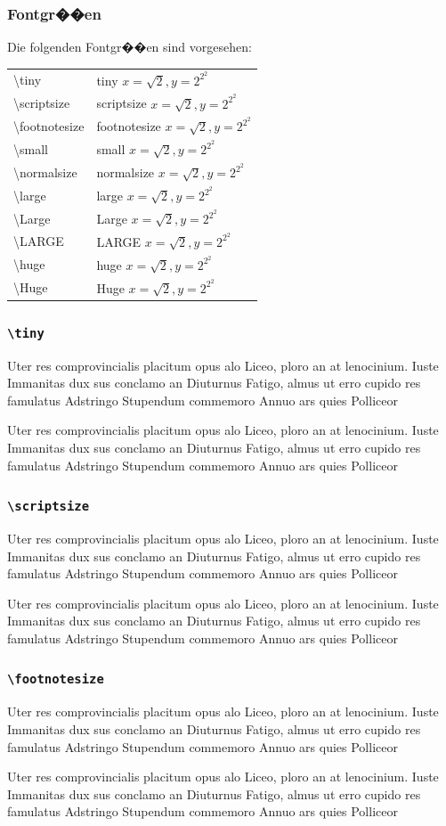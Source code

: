 \documentclass[t]{beamer}
\newcommand{\parxmpl}{
  Uter res comprovincialis placitum opus alo Liceo, ploro an at lenocinium.
  Iuste Immanitas dux sus conclamo an Diuturnus
  Fatigo, almus ut erro cupido res famulatus Adstringo
  Stupendum commemoro Annuo ars quies Polliceor
}
\begin{document}
\begin{frame}
  \frametitle{Fontgr��en}

  Die folgenden Fontgr��en sind vorgesehen:

  \begin{tabular}{>{\ttfamily}ll}
  \textbackslash tiny & \tiny tiny \quad \(x=\sqrt{2}, y=2^{2^2}\) \\
  \textbackslash scriptsize & \scriptsize scriptsize \quad \(x=\sqrt{2}, y=2^{2^2}\) \\
  \textbackslash footnotesize & \footnotesize footnotesize \quad \(x=\sqrt{2}, y=2^{2^2}\) \\
  \textbackslash small & \small small \quad \(x=\sqrt{2}, y=2^{2^2}\) \\
  \textbackslash normalsize & \normalsize normalsize \quad \(x=\sqrt{2}, y=2^{2^2}\) \\
  \textbackslash large & \large large \quad \(x=\sqrt{2}, y=2^{2^2}\) \\
  \textbackslash Large & \Large Large \quad \(x=\sqrt{2}, y=2^{2^2}\) \\
  \textbackslash LARGE & \LARGE LARGE \quad \(x=\sqrt{2}, y=2^{2^2}\) \\
  \textbackslash huge & \huge huge \quad \(x=\sqrt{2}, y=2^{2^2}\) \\
  \textbackslash Huge & \Huge Huge \quad \(x=\sqrt{2}, y=2^{2^2}\)
  \end{tabular}
\end{frame}

\setlength{\parskip}{.6\baselineskip}
\begin{frame}
  \frametitle{\texttt{\textbackslash tiny}}
  \tiny

  \parxmpl

  \parxmpl

\end{frame}

\begin{frame}
  \frametitle{\texttt{\textbackslash scriptsize}}
  \scriptsize

  \parxmpl

  \parxmpl

\end{frame}

\begin{frame}
  \frametitle{\texttt{\textbackslash footnotesize}}
  \footnotesize

  \parxmpl

  \parxmpl

\end{frame}
\end{document}

